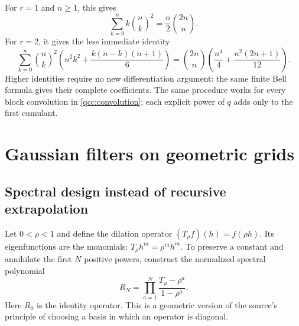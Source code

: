 \documentclass[11pt,a4paper,oneside,openany]{book}
\theoremstyle{definition}
\theoremstyle{remark}
\begin{document}
For \(r=1\) and \(n\ge1\), this gives
\[
 \sum_{k=0}^{n} k\binom nk^2=\frac n2\binom{2n}{n}.
\]
For \(r=2\), it gives the less immediate identity
\[
 \sum_{k=0}^{n}\binom nk^2
    \left(n^2k^2+\frac{k(n-k)(n+1)}6\right)
 =\binom{2n}{n}\left(\frac{n^4}{4}
                      +\frac{n^2(2n+1)}{12}\right).
\]
Higher identities require no new differentiation argument: the same finite Bell
formula gives their complete coefficients. The same procedure works for every
block convolution in \cref{qcc:convolution}; each explicit power of \(q\)
adds only to the first cumulant.

\chapter{Gaussian filters on geometric grids}
\label{qcc:filters}
\section{Spectral design instead of recursive extrapolation}
Let \(0<\rho<1\) and define the dilation operator
\((T_\rho f)(h)=f(\rho h)\). Its eigenfunctions are the monomials:
\(T_\rho h^m=\rho^m h^m\). To preserve a constant and annihilate the
first \(N\) positive powers, construct the normalized spectral polynomial
\begin{equation}\label{qcc:filter-def}
 R_N=\prod_{a=1}^{N}\frac{T_\rho-\rho^a}{1-\rho^a}.
\end{equation}
Here \(R_0\) is the identity operator. This is a geometric version of the
source's principle of choosing a basis in which an operator is diagonal.
\end{document}
